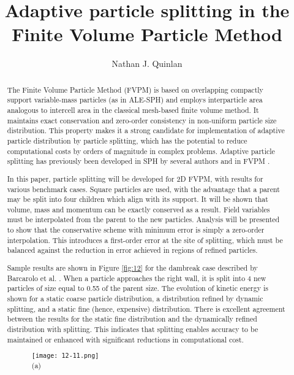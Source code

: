 \documentclass[10pt]{article}
\title{Adaptive particle splitting in the Finite Volume Particle Method}
\date{}
\author[$\relax$]{Nathan J. Quinlan}
\affil[$\relax$]{Mechanical Engineering, National University of Ireland Galway}
\begin{document}
\maketitle


\begin{abstract}
The Finite Volume Particle Method (FVPM) is based on overlapping compactly support variable-mass particles (as in ALE-SPH) and employs interparticle area analogous to intercell area in the classical mesh-based finite volume method. It maintains exact conservation and zero-order consistency in non-uniform particle size distribution. This property makes it a strong candidate for implementation of adaptive particle distribution by particle splitting, which has the potential to reduce computational costs by orders of magnitude in complex problems. Adaptive particle splitting has previously been developed in SPH by several authors \cite{lastiwka2005adaptive,barcarolo2014adaptive,lopez2013dynamic} and in FVPM \cite{jahanbakhsh2016development}.

In this paper, particle splitting will be developed for 2D FVPM, with results for various benchmark cases. Square particles are used, with the advantage that a parent may be split into four children which align with its support. It will be shown that volume, mass and momentum can be exactly conserved as a result. Field variables must be interpolated from the parent to the new particles. Analysis will be presented to show that the conservative scheme with minimum error is simply a zero-order interpolation. This introduces a first-order error at the site of splitting, which must be balanced against the reduction in error achieved in regions of refined particles.

Sample results are shown in Figure \ref{fig:12} for the dambreak case described by Barcarolo et al. \cite{lopez2013dynamic}. When a particle approaches the right wall, it is split into 4 new particles of size equal to 0.55 of the parent size. The evolution of kinetic energy is shown for a static coarse particle distribution, a distribution refined by dynamic splitting, and a static fine (hence, expensive) distribution. There is excellent agreement between the results for the static fine distribution and the dynamically refined distribution with splitting. This indicates that splitting enables accuracy to be maintained or enhanced with significant reductions in computational cost.
 
\begin{figure}[!htb]
\begin{minipage}[b]{0.5\linewidth}
\centering
\texttt{[image: 12-11.png]}\\ (a)


\end{minipage}
\end{figure}
\end{abstract}
\end{document}
